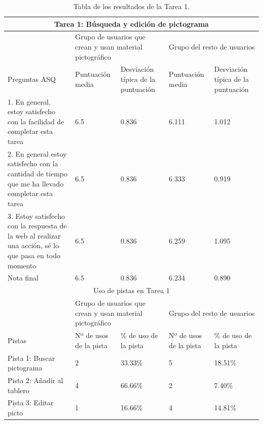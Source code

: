 \begin{table}

\begin{tabular}{ |p{4cm}|p{2cm}|p{2cm}|p{2cm}|p{2cm}|  }
	\hline
	\multicolumn{5}{|c|}{Tarea 1: Búsqueda y edición de pictograma} \\
	\hline
	 & \multicolumn{2}{p{4cm}|}{Grupo de usuarios que crean y usan material pictográfico} & \multicolumn{2}{p{4cm}|}{Grupo del resto de usuarios }  \\ 
	\hline
	 Preguntas ASQ & Puntuación media  &Desviación típica de la puntuación & Puntuación media & Desviación típica de la puntuación\\
	\hline
	1. En general, estoy satisfecho con la facilidad de completar esta tarea &6.5  &0.836 &6.111  &1.012\\
	\hline
	2. En general estoy satisfecho con la cantidad de tiempo que me ha llevado completar esta tarea&6.5  &0.836  &6.333 &0.919\\
	\hline
	3. Estoy satisfecho con la respuesta de la web al realizar una acción, sé lo que pasa en todo momento &6.5 &0.836 & 6.259  &1.095\\
	\hline
	Nota final &6.5 &0.836 &6.234  &0.890\\
	\hline
	\multicolumn{5}{|c|}{Uso de pistas en Tarea 1} \\
	\hline
	& \multicolumn{2}{p{4cm}|}{Grupo de usuarios que crean y usan material pictográfico} & \multicolumn{2}{p{4cm}|}{Grupo del resto de usuarios }  \\ 
	\hline
	 Pistas &Nº de usos de la pista &\% de uso de la pista&Nº de usos de la pista&\% de uso de la pista\\
	\hline
	Pista 1: Buscar pictograma &2  &33.33\% &5  &18.51\%\\
	\hline
	Pista 2: Añadir al tablero &4  &66.66\%  &2 &7.40\%\\
	\hline
	Pista 3: Editar picto &1 &16.66\% &4  &14.81\%\\
	\hline
\end{tabular}
\caption{\label{tab:area1respuestas}Tabla de los resultados de la Tarea 1.}
\end{table}

